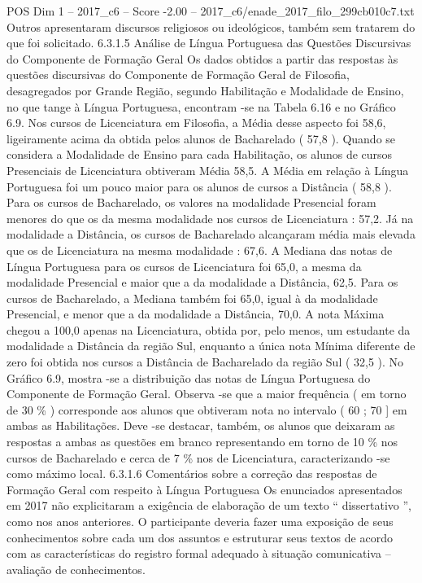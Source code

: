 \begin{textsample}{POS Dim 1 – 2017\_c6 – Score -2.00 – 2017\_c6/enade\_2017\_filo\_299cb010c7.txt}
Outros apresentaram discursos religiosos ou ideológicos, também sem tratarem do que foi solicitado. 6.3.1.5 Análise de Língua Portuguesa das Questões Discursivas do Componente de Formação Geral Os dados obtidos a partir das respostas às questões discursivas do Componente de Formação Geral de Filosofia, desagregados por Grande Região, segundo Habilitação e Modalidade de Ensino, no que tange à Língua Portuguesa, encontram -se na Tabela 6.16 e no Gráfico 6.9.
Nos cursos de Licenciatura em Filosofia, a Média desse aspecto foi 58,6, ligeiramente acima da obtida pelos alunos de Bacharelado ( 57,8 ).
Quando se considera a Modalidade de Ensino para cada Habilitação, os alunos de cursos Presenciais de Licenciatura obtiveram Média 58,5.
A Média em relação à Língua Portuguesa foi um pouco maior para os alunos de cursos a Distância ( 58,8 ).
Para os cursos de Bacharelado, os valores na modalidade Presencial foram menores do que os da mesma modalidade nos cursos de Licenciatura : 57,2.
Já na modalidade a Distância, os cursos de Bacharelado alcançaram média mais elevada que os de Licenciatura na mesma modalidade : 67,6.
A Mediana das notas de Língua Portuguesa para os cursos de Licenciatura foi 65,0, a mesma da modalidade Presencial e maior que a da modalidade a Distância, 62,5.
Para os cursos de Bacharelado, a Mediana também foi 65,0, igual à da modalidade Presencial, e menor que a da modalidade a Distância, 70,0.
A nota Máxima chegou a 100,0 apenas na Licenciatura, obtida por, pelo menos, um estudante da modalidade a Distância da região Sul, enquanto a única nota Mínima diferente de zero foi obtida nos cursos a Distância de Bacharelado da região Sul ( 32,5 ).
No Gráfico 6.9, mostra -se a distribuição das notas de Língua Portuguesa do Componente de Formação Geral.
Observa -se que a maior frequência ( em torno de 30 \% ) corresponde aos alunos que obtiveram nota no intervalo ( 60 ; 70 ] em ambas as Habilitações.
Deve -se destacar, também, os alunos que deixaram as respostas a ambas as questões em branco representando em torno de 10 \% nos cursos de Bacharelado e cerca de 7 \% nos de Licenciatura, caracterizando -se como máximo local. 6.3.1.6 Comentários sobre a correção das respostas de Formação Geral com respeito à Língua Portuguesa Os enunciados apresentados em 2017 não explicitaram a exigência de elaboração de um texto “ dissertativo ”, como nos anos anteriores.
O participante deveria fazer uma exposição de seus conhecimentos sobre cada um dos assuntos e estruturar seus textos de acordo com as características do registro formal adequado à situação comunicativa – avaliação de conhecimentos.

\end{textsample}
